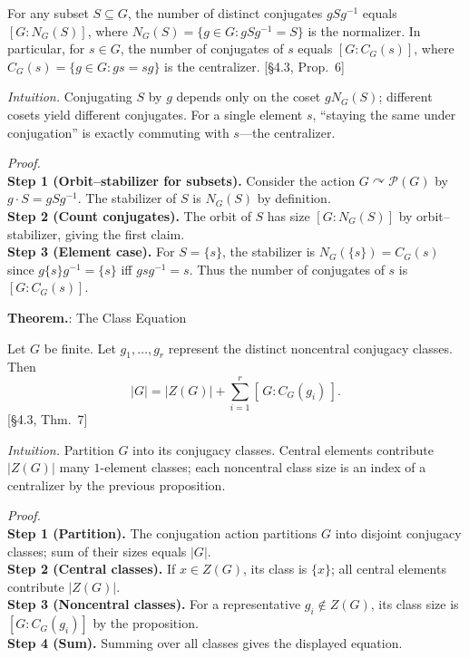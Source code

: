 \documentclass[12pt]{article}
\theoremstyle{definition}
\begin{document}
\newpage

For any subset $S\subseteq G$, the number of distinct conjugates $gSg^{-1}$ equals $[G:N_G(S)]$, where $N_G(S)=\{g\in G: gSg^{-1}=S\}$ is the normalizer. In particular, for $s\in G$, the number of conjugates of $s$ equals $[G:C_G(s)]$, where $C_G(s)=\{g\in G: gs=sg\}$ is the centralizer. \hfill {\footnotesize [§4.3, Prop.~6]}\\

\dotfill

\emph{Intuition.} Conjugating $S$ by $g$ depends only on the coset $gN_G(S)$; different cosets yield different conjugates. For a single element $s$, “staying the same under conjugation” is exactly commuting with $s$—the centralizer.

\dotfill

\emph{Proof.}\\
\textbf{Step 1 (Orbit–stabilizer for subsets).} Consider the action $G\curvearrowright\mathcal P(G)$ by $g\cdot S=gSg^{-1}$. The stabilizer of $S$ is $N_G(S)$ by definition.\\
\textbf{Step 2 (Count conjugates).} The orbit of $S$ has size $[G:N_G(S)]$ by orbit–stabilizer, giving the first claim.\\
\textbf{Step 3 (Element case).} For $S=\{s\}$, the stabilizer is $N_G(\{s\})=C_G(s)$ since $g\{s\}g^{-1}=\{s\}$ iff $gsg^{-1}=s$. Thus the number of conjugates of $s$ is $[G:C_G(s)]$.\\

\newpage


\noindent\textbf{Theorem.}: The Class Equation

\newpage

Let $G$ be finite. Let $g_1,\dots,g_r$ represent the distinct noncentral conjugacy classes. Then
\[
|G|=|Z(G)|+\sum_{i=1}^r [\,G:C_G(g_i)\,].
\]
\hfill {\footnotesize [§4.3, Thm.~7]}\\

\dotfill

\emph{Intuition.} Partition $G$ into its conjugacy classes. Central elements contribute $|Z(G)|$ many $1$-element classes; each noncentral class size is an index of a centralizer by the previous proposition.

\dotfill

\emph{Proof.}\\
\textbf{Step 1 (Partition).} The conjugation action partitions $G$ into disjoint conjugacy classes; sum of their sizes equals $|G|$.\\
\textbf{Step 2 (Central classes).} If $x\in Z(G)$, its class is $\{x\}$; all central elements contribute $|Z(G)|$.\\
\textbf{Step 3 (Noncentral classes).} For a representative $g_i\notin Z(G)$, its class size is $[G:C_G(g_i)]$ by the proposition.\\
\textbf{Step 4 (Sum).} Summing over all classes gives the displayed equation.\\
\end{document}
